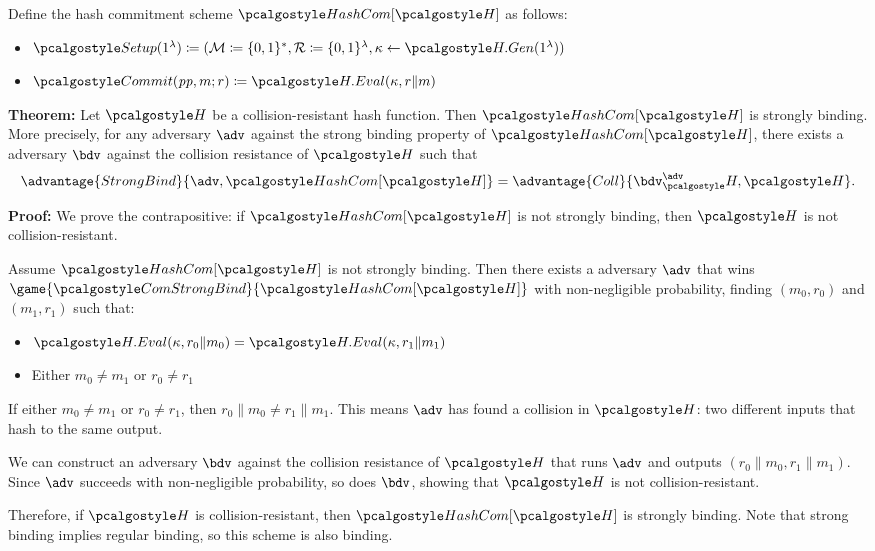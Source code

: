 \ifsolutions
\begin{mysolution}
  Define the hash commitment scheme $\algo{HashCom}[\algo{H}]$ as follows:
  \begin{itemize}
    \item $\algo{Setup}(1^\lambda) \defeq (\mathcal{M} \defeq \{0, 1\}^*, \mathcal{R} \defeq \{0, 1\}^\lambda, \kappa \gets \algo{H.Gen}(1^\lambda))$
    \item $\algo{Commit}(\params, m; r) \defeq \algo{H.Eval}(\kappa, r \| m)$
  \end{itemize}
  
  \textbf{Theorem:} Let $\algo{H}$ be a collision-resistant hash function. Then $\algo{HashCom}[\algo{H}]$ is strongly binding.
  More precisely, for any \ppt adversary $\adv$ against the strong binding property of $\algo{HashCom}[\algo{H}]$, there exists a \ppt adversary $\bdv$ against the collision resistance of $\algo{H}$ such that
  \[
  \advantage{StrongBind}{\adv, \algo{HashCom}[\algo{H}]} = \advantage{Coll}{\bdv^\adv_\algo{H}, \algo{H}}.
  \]
  
  \textbf{Proof:} We prove the contrapositive: if $\algo{HashCom}[\algo{H}]$ is not strongly binding, then $\algo{H}$ is not collision-resistant.
  
  Assume $\algo{HashCom}[\algo{H}]$ is not strongly binding.
  Then there exists a \ppt adversary $\adv$ that wins $\game{\algo{ComStrongBind}}{\algo{HashCom}[\algo{H}]}$ with non-negligible probability, finding $(m_0, r_0)$ and $(m_1, r_1)$ such that:
  \begin{itemize}
    \item $\algo{H.Eval}(\kappa, r_0 \| m_0) = \algo{H.Eval}(\kappa, r_1 \| m_1)$
    \item Either $m_0 \neq m_1$ or $r_0 \neq r_1$
  \end{itemize}
  
  If either $m_0 \neq m_1$ or $r_0 \neq r_1$, then $r_0 \| m_0 \neq r_1 \| m_1$.
  This means $\adv$ has found a collision in $\algo{H}$: two different inputs that hash to the same output.
  
  We can construct an adversary $\bdv$ against the collision resistance of $\algo{H}$ that runs $\adv$ and outputs $(r_0 \| m_0, r_1 \| m_1)$.
  Since $\adv$ succeeds with non-negligible probability, so does $\bdv$, showing that $\algo{H}$ is not collision-resistant.
  
  Therefore, if $\algo{H}$ is collision-resistant, then $\algo{HashCom}[\algo{H}]$ is strongly binding.
  Note that strong binding implies regular binding, so this scheme is also binding.
\end{mysolution}
\fi

